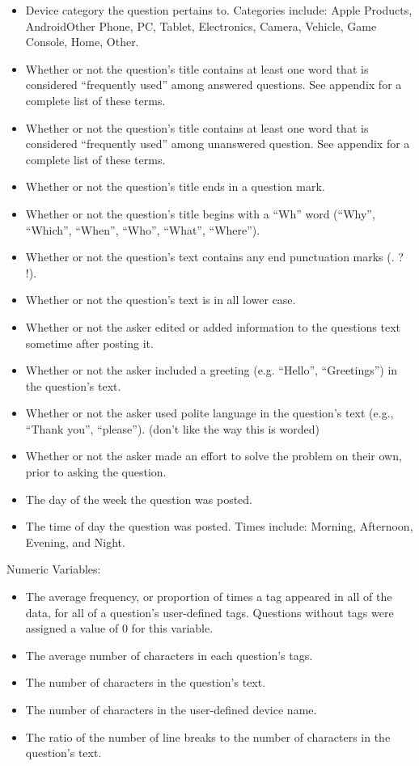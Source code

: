 \documentclass[12pt]{article}
\begin{document}
\begin{itemize}
  \item Device category the question pertains to. Categories include: Apple Products, Android\/Other Phone, PC, Tablet, Electronics, Camera, Vehicle, Game Console, Home, Other.
  \item Whether or not the question's title contains at least one word that is considered ``frequently used'' among answered questions. See appendix for a complete list of these terms. 
  \item Whether or not the question's title contains at least one word that is considered ``frequently used'' among unanswered question. See appendix for a complete list of these terms. 
  \item Whether or not the question's title ends in a question mark.
  \item Whether or not the question's title begins with a ``Wh'' word (``Why'', ``Which'', ``When'', ``Who'', ``What'', ``Where''). 
  \item Whether or not the question's text contains any end punctuation marks (. ? !). 
  \item Whether or not the question's text is in all lower case. 
  \item Whether or not the asker edited or added information to the questions text sometime after posting it. 
  \item Whether or not the asker included a greeting (e.g. ``Hello'', ``Greetings'') in the question's text.
  \item Whether or not the asker used polite language in the question's text (e.g., ``Thank you'', ``please''). (don't like the way this is worded) 
  \item Whether or not the asker made an effort to solve the problem on their own, prior to asking the question.
  \item The day of the week the question was posted. 
  \item The time of day the question was posted. Times include: Morning, Afternoon, Evening, and Night. 
\end{itemize}

Numeric Variables:

\begin{itemize}
  \item The average frequency, or proportion of times a tag appeared in all of the data, for all of a question's user-defined tags. Questions without tags were assigned a value of 0 for this variable. 
  \item The average number of characters in each question's tags. 
  \item The number of characters in the question's text. 
  \item The number of characters in the user-defined device name. 
  \item The ratio of the number of line breaks to the number of characters in the question's text.
\end{itemize}
\end{document}
